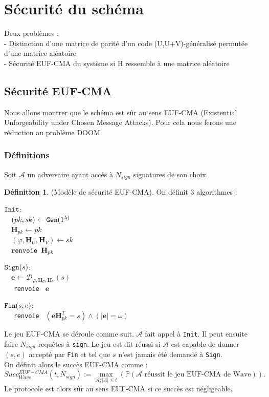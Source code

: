 \documentclass[12pt]{article}
\theoremstyle{definition}
\newtheorem{defi}[thm]{Définition}
\begin{document}
\section{Sécurité du schéma}
Deux problèmes : \\
- Distinction d'une matrice de parité d'un code (U,U+V)-généralisé permutée d'une matrice aléatoire \\
- Sécurité EUF-CMA du système si H ressemble à une matrice aléatoire \\

\subsection{Sécurité EUF-CMA}
Nous allons montrer que le schéma est sûr au sens EUF-CMA (Existential Unforgeability under Chosen Message Attacks). Pour cela nous ferons une réduction au problème DOOM.
\subsubsection{Définitions}

Soit $\mathcal{A}$ un adversaire ayant accès à $N_{sign}$ signatures de son choix.
\begin{defi} (Modèle de sécurité EUF-CMA). On définit 3 algorithmes :
\begin{multicols}{2}
\begin{flushleft}
$\verb|Init|$:\\
	$\quad (pk,sk) \leftarrow \verb|Gen|(1^{\lambda)}$ \\
	$\quad \mathbf{H}_{pk} \leftarrow pk$ \\
	$\quad (\varphi, \mathbf{H}_{U},\mathbf{H}_{V}) \leftarrow sk$ \\
	$\quad \verb|renvoie | \mathbf{H}_{pk}$ \\
\end{flushleft}
\begin{flushleft}
$\verb|Sign|(s)$: \\
	$\quad \mathbf{e} \leftarrow \mathcal{D}_{\varphi,\mathbf{H}_{U},\mathbf{H}_{V}}(s)$ \\
	$\quad$ \verb|renvoie | $\mathbf{e}$
\end{flushleft}
\begin{flushleft}
$\verb|Fin|(s,e)$: \\
	$\quad$ \verb|renvoie | $(\mathbf{e}\mathbf{H}_{pk}^T = s) \land (|\mathbf{e}| = \omega)$
\end{flushleft}
\end{multicols}
Le jeu EUF-CMA se déroule comme suit. $\mathcal{A}$ fait appel à \verb|Init|. Il peut ensuite faire $N_{sign}$ requêtes à \verb|sign|. Le jeu est dit réussi si $\mathcal{A}$ est capable de donner $(s,e)$ accepté par \verb|Fin| et tel que $s$ n'est jamais été demandé à \verb|Sign|. \\
On définit alors le succès EUF-CMA comme :
$$Succ^{EUF-CMA}_{Wave}(t,N_{sign}) := \max_{\mathcal{A};|A|\leq t}(\mathbb{P}(\mathcal{A}\text{ réussit le jeu EUF-CMA de Wave})).$$
Le protocole est alors sûr au sens EUF-CMA si ce succès est négligeable.
\end{defi}
\end{document}

